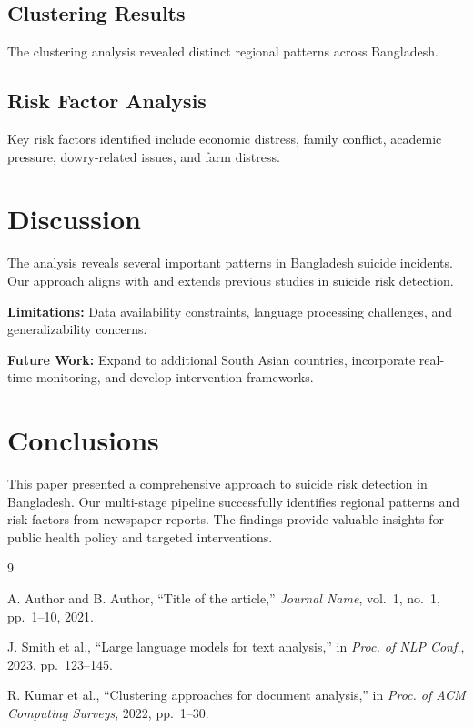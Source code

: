 \documentclass[conference]{IEEEtran}
\begin{document}
\subsection{Clustering Results}
The clustering analysis revealed distinct regional patterns across Bangladesh.

\subsection{Risk Factor Analysis}
Key risk factors identified include economic distress, family conflict, academic pressure, dowry-related issues, and farm distress.

\section{Discussion}

The analysis reveals several important patterns in Bangladesh suicide incidents. Our approach aligns with and extends previous studies in suicide risk detection.

\textbf{Limitations:} Data availability constraints, language processing challenges, and generalizability concerns.

\textbf{Future Work:} Expand to additional South Asian countries, incorporate real-time monitoring, and develop intervention frameworks.

\section{Conclusions}

This paper presented a comprehensive approach to suicide risk detection in Bangladesh. Our multi-stage pipeline successfully identifies regional patterns and risk factors from newspaper reports. The findings provide valuable insights for public health policy and targeted interventions.

\begin{thebibliography}{9}

A. Author and B. Author, ``Title of the article,'' \textit{Journal Name}, vol.~1, no.~1, pp.~1--10, 2021.

J. Smith et al., ``Large language models for text analysis,'' in \textit{Proc. of NLP Conf.}, 2023, pp.~123--145.

R. Kumar et al., ``Clustering approaches for document analysis,'' in \textit{Proc. of ACM Computing Surveys}, 2022, pp.~1--30.

\end{thebibliography}
\end{document}
